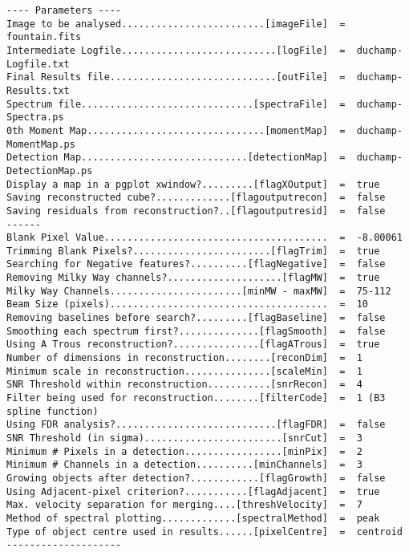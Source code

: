 %
{\scriptsize
\begin{verbatim}
---- Parameters ----
Image to be analysed.........................[imageFile]  =  fountain.fits
Intermediate Logfile...........................[logFile]  =  duchamp-Logfile.txt
Final Results file.............................[outFile]  =  duchamp-Results.txt
Spectrum file..............................[spectraFile]  =  duchamp-Spectra.ps
0th Moment Map...............................[momentMap]  =  duchamp-MomentMap.ps
Detection Map.............................[detectionMap]  =  duchamp-DetectionMap.ps
Display a map in a pgplot xwindow?.........[flagXOutput]  =  true
Saving reconstructed cube?.............[flagoutputrecon]  =  false
Saving residuals from reconstruction?..[flagoutputresid]  =  false
------
Blank Pixel Value.......................................  =  -8.00061
Trimming Blank Pixels?........................[flagTrim]  =  true
Searching for Negative features?..........[flagNegative]  =  false
Removing Milky Way channels?....................[flagMW]  =  true
Milky Way Channels.......................[minMW - maxMW]  =  75-112
Beam Size (pixels)......................................  =  10
Removing baselines before search?.........[flagBaseline]  =  false
Smoothing each spectrum first?..............[flagSmooth]  =  false
Using A Trous reconstruction?...............[flagATrous]  =  true
Number of dimensions in reconstruction........[reconDim]  =  1
Minimum scale in reconstruction...............[scaleMin]  =  1
SNR Threshold within reconstruction...........[snrRecon]  =  4
Filter being used for reconstruction........[filterCode]  =  1 (B3 spline function)
Using FDR analysis?............................[flagFDR]  =  false
SNR Threshold (in sigma)........................[snrCut]  =  3
Minimum # Pixels in a detection.................[minPix]  =  2
Minimum # Channels in a detection..........[minChannels]  =  3
Growing objects after detection?............[flagGrowth]  =  false
Using Adjacent-pixel criterion?...........[flagAdjacent]  =  true
Max. velocity separation for merging....[threshVelocity]  =  7
Method of spectral plotting.............[spectralMethod]  =  peak
Type of object centre used in results......[pixelCentre]  =  centroid
--------------------
\end{verbatim}
}
